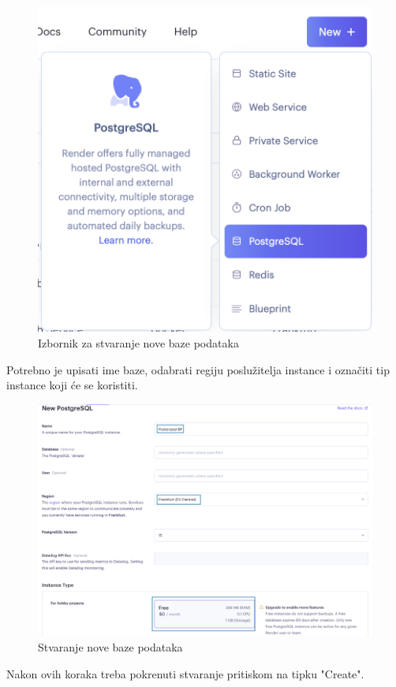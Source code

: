 			\begin{figure}[H]
				\includegraphics[scale=0.3]{slike/deploy/database1.png} %
				\centering
				\caption{Izbornik za stvaranje nove baze podataka}
				\label{fig:promjene}
			\end{figure}
			
			Potrebno je upisati ime baze, odabrati regiju poslužitelja instance i označiti tip instance koji će se koristiti.
			\begin{figure}[H]
				\includegraphics[scale=0.3]{slike/deploy/database2.png} %
				\centering
				\caption{Stvaranje nove baze podataka}
				\label{fig:promjene}
			\end{figure}
			Nakon ovih koraka treba pokrenuti stvaranje pritiskom na tipku "Create".
			
